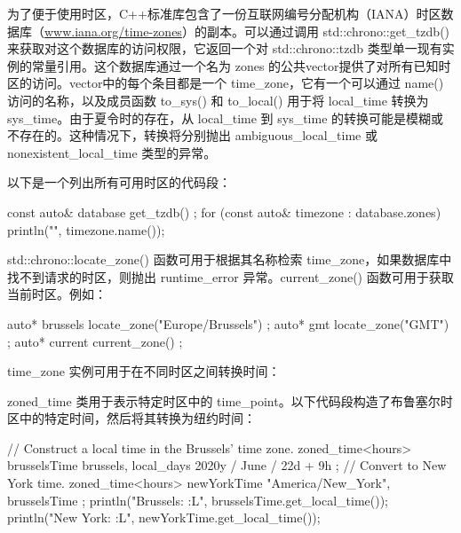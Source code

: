 为了便于使用时区，C++标准库包含了一份互联网编号分配机构（IANA）时区数据库（\url{www.iana.org/time-zones}）的副本。可以通过调用 std::chrono::get\_tzdb() 来获取对这个数据库的访问权限，它返回一个对 std::chrono::tzdb 类型单一现有实例的常量引用。这个数据库通过一个名为 zones 的公共vector提供了对所有已知时区的访问。vector中的每个条目都是一个 time\_zone，它有一个可以通过 name() 访问的名称，以及成员函数 to\_sys() 和 to\_local() 用于将 local\_time 转换为 sys\_time。由于夏令时的存在，从 local\_time 到 sys\_time 的转换可能是模糊或不存在的。这种情况下，转换将分别抛出 ambiguous\_local\_time 或 nonexistent\_local\_time 类型的异常。

以下是一个列出所有可用时区的代码段：

\begin{cpp}
const auto& database { get_tzdb() };
for (const auto& timezone : database.zones) {
    println("{}", timezone.name());
}
\end{cpp}

std::chrono::locate\_zone() 函数可用于根据其名称检索 time\_zone，如果数据库中找不到请求的时区，则抛出 runtime\_error 异常。current\_zone() 函数可用于获取当前时区。例如：

\begin{cpp}
auto* brussels { locate_zone("Europe/Brussels") };
auto* gmt { locate_zone("GMT") };
auto* current { current_zone() };
\end{cpp}

time\_zone 实例可用于在不同时区之间转换时间：


zoned\_time 类用于表示特定时区中的 time\_point。以下代码段构造了布鲁塞尔时区中的特定时间，然后将其转换为纽约时间：

\begin{cpp}
// Construct a local time in the Brussels' time zone.
zoned_time<hours> brusselsTime{ brussels, local_days { 2020y / June / 22d } + 9h };
// Convert to New York time.
zoned_time<hours> newYorkTime { "America/New_York", brusselsTime };
println("Brussels: {:L}", brusselsTime.get_local_time());
println("New York: {:L}", newYorkTime.get_local_time());
\end{cpp}











